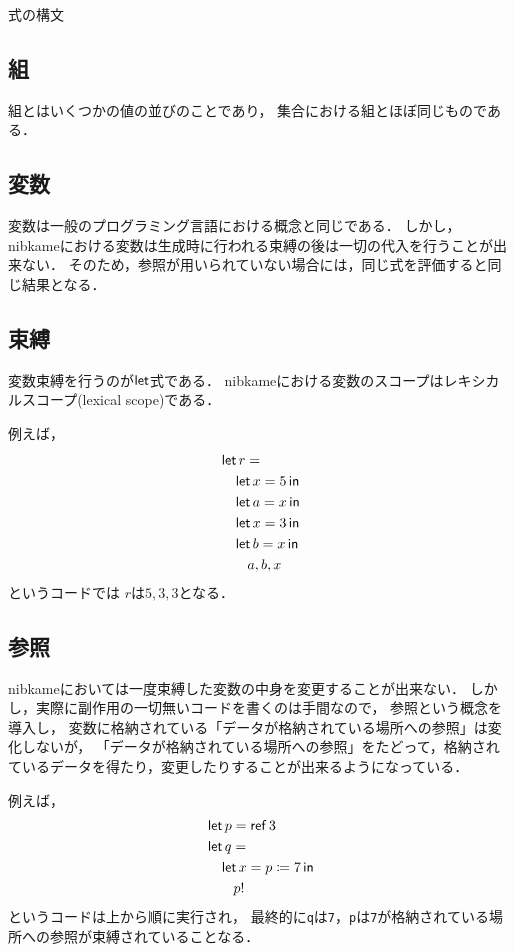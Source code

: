 \documentclass[a4paper,titlepage,report,disablejfam]{jsbook}
\begin{document}
\begin{resbonsiblesection}{式の構文}{\sakamoto}
\subsection{組}\label{ssc:expr-tuple}
組とはいくつかの値の並びのことであり，
集合における組とほぼ同じものである．

\subsection{変数}\label{ssc:expr-variable}
変数は一般のプログラミング言語における概念と同じである．
しかし，nibkameにおける変数は生成時に行われる束縛の後は一切の代入を行うことが出来ない．
そのため，参照が用いられていない場合には，同じ式を評価すると同じ結果となる．

\subsection{束縛}\label{ssc:expr-let}
変数束縛を行うのが$\mathop{\mathsf{let}}$式である．
nibkameにおける変数のスコープはレキシカルスコープ(lexical scope)である．

例えば，
\begin{equation}
\begin{aligned}
&\mathop{\mathsf{let}} r = \\
&\quad \mathop{\mathsf{let}} x = 5 \mathop{\mathsf{in}} \\
&\quad \mathop{\mathsf{let}} a = x \mathop{\mathsf{in}} \\
&\quad \mathop{\mathsf{let}} x = 3 \mathop{\mathsf{in}} \\
&\quad \mathop{\mathsf{let}} b = x \mathop{\mathsf{in}} \\
&\quad\quad a, b, x
\end{aligned}
\end{equation}
というコードでは
$r$は$5, 3, 3$となる．

\subsection{参照}\label{ssc:expr-reference}
nibkameにおいては一度束縛した変数の中身を変更することが出来ない．
しかし，実際に副作用の一切無いコードを書くのは手間なので，
参照という概念を導入し，
変数に格納されている「データが格納されている場所への参照」は変化しないが，
「データが格納されている場所への参照」をたどって，格納されているデータを得たり，変更したりすることが出来るようになっている．

例えば，
\begin{equation}
\begin{aligned}
&\mathop{\mathsf{let}} p = \mathop{\mathsf{ref}} 3 \\
&\mathop{\mathsf{let}} q = \\
&\quad \mathop{\mathsf{let}} x = p \coloneqq 7 \mathop{\mathsf{in}} \\
&\quad\quad p!
\end{aligned}
\end{equation}
というコードは上から順に実行され，
最終的に\lstinline|q|は\lstinline|7|，\lstinline|p|は\lstinline|7|が格納されている場所への参照が束縛されていることなる．


\end{resbonsiblesection}
\end{document}

